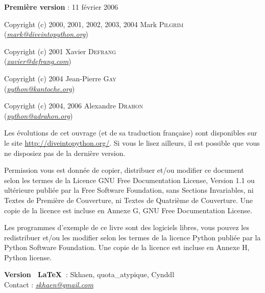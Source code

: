 \documentclass[a4paper,french,11pt,twoside]{book}
\begin{document}

\bigskip
\noindent \textbf{Première version} : 11 février 2006

\medskip
\noindent Copyright (c) 2000, 2001, 2002, 2003, 2004 Mark \textsc{Pilgrim} \\ (\href{mailto:mark@diveintopython.org}{\textit{mark@diveintopython.org}})

\medskip
\noindent Copyright (c) 2001 Xavier \textsc{Defrang}\\(\href{mailto:xavier@defrang.com}{\textit{xavier@defrang.com}})

\medskip
\noindent Copyright (c) 2004 Jean-Pierre \textsc{Gay}\\(\href{mailto:python@kantoche.org}{\textit{python@kantoche.org}})

\medskip
\noindent Copyright (c) 2004, 2006 Alexandre \textsc{Drahon}\\(\href{mailto:python@adrahon.org}{\textit{python@adrahon.org}})

\medskip
Les évolutions de cet ouvrage (et de sa traduction française) sont disponibles sur le site \url{http://diveintopython.org/}. Si vous le lisez ailleurs, il est possible que vous ne disposiez pas de la dernière version.

\medskip
\noindent Permission vous est donnée de copier, distribuer et/ou modifier ce document selon les termes de la Licence GNU Free Documentation License, Version 1.1 ou ultérieure publiée par la Free Software Foundation, sans Sections Invariables, ni Textes de Première de Couverture, ni Textes de Quatrième de Couverture. Une copie de la licence est incluse en Annexe G, GNU Free Documentation License.

\medskip
\noindent Les programmes d'exemple de ce livre sont des logiciels libres, vous pouvez les redistribuer et/ou les modifier selon les termes de la licence Python publiée par la Python Software Foundation. Une copie de la licence est incluse en Annexe H, Python license.

\bigskip
\noindent \textbf{Version ~\LaTeX~}: Skhaen, quota\_atypique, Cynddl \\
\noindent Contact : \href{mailto:skhaen@gmail.com}{\textit{skhaen@gmail.com}}

\newpage
\tableofcontents
\newpage





%
%
%
%
\end{document}
